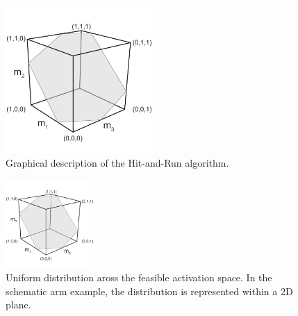 \begin{figure}[h]
\centering
\includegraphics[width=0.5\textwidth,page=10]{sections/figs/HitandRunSchematics_all.pdf}
\caption{Graphical description of the Hit-and-Run algorithm.}
\label{fig:hitruncube}
\end{figure}



\begin{figure}[h]
\centering
\includegraphics[width=0.3\textwidth,page=9]{sections/figs/HitandRunSchematics_all.pdf}
\caption{Uniform distribution aross the feasible activation space. In the schematic arm example, the distribution is represented within a 2D plane.}
\label{fig:posthitrun_distribution}
\end{figure}



